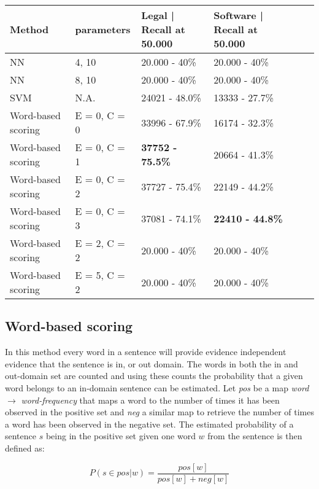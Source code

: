 \documentclass[11pt]{article}
\begin{document}
\begin{table*}[t]
    \begin{tabular}{|l|l|l|l|l|l|}
    \hline
    Method & parameters & Legal | Recall at 50.000  & Software | Recall at 50.000 \\ \hline
    NN      & 4, 10          & 20.000 - 40\%  & 20.000 - 40\%        \\ \hline
    NN      & 8, 10          & 20.000 - 40\%  & 20.000 - 40\%        \\ \hline
    SVM      & N.A.          & 24021 - 48.0\%  & 13333 - 27.7\%        \\ \hline
    Word-based scoring  & E = 0, C = 0 & 33996 - 67.9\%  & 16174 - 32.3\%        \\ \hline
    Word-based scoring  & E = 0, C = 1 & \textbf{37752 - 75.5\%}  & 20664 - 41.3\%        \\ \hline
    Word-based scoring  & E = 0, C = 2 & 37727 - 75.4\%  & 22149 - 44.2\%        \\ \hline
    Word-based scoring  & E = 0, C = 3 & 37081 - 74.1\%  & \textbf{22410 - 44.8\%}        \\ \hline
    Word-based scoring  & E = 2, C = 2 & 20.000 - 40\%  & 20.000 - 40\%        \\ \hline
    Word-based scoring  & E = 5, C = 2 & 20.000 - 40\%  & 20.000 - 40\%        \\ \hline
    \end{tabular}
\end{table*}


\subsection{Word-based scoring}
\label{wbs}
In this method every word in a sentence will provide evidence independent evidence that the sentence is in, or out domain. The words in both the in and out-domain set are counted and using these counts the probability that a given word belongs to an in-domain sentence can be estimated. Let \textit{pos} be a map \textit{word} $\rightarrow$ \textit{word-frequency} that maps a word to the number of times it has been observed in the positive set and \textit{neg} a similar map to retrieve the number of times a word has been observed in the negative set.
The estimated probability of a sentence $s$ being in the positive set given one word $w$ from the sentence is then defined as:

\begin{equation} \label{eq:simple}
P(s\in pos | w) = \frac{pos[w]}{pos[w] + neg[w]}
\end{equation}
\end{document}
